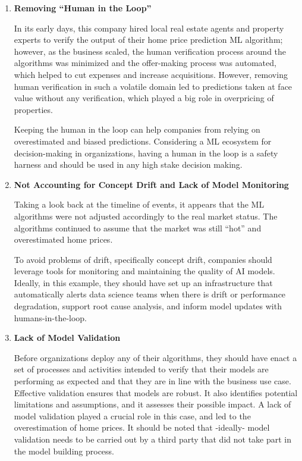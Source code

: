 \documentclass{article}
\begin{document}
\begin{enumerate}
    \item \textbf{Removing ``Human in the Loop''}
    
    \smallskip In its early days, this company hired local real estate agents and property experts to verify the output of their home price prediction ML algorithm; however, as the business scaled, the human verification process around the algorithms was minimized\cite{bloomberg} and the offer-making process was automated, which helped to cut expenses and increase acquisitions.
    However, removing human verification in such a volatile domain led to predictions taken at face value without any verification, which played a big role in overpricing of properties.
    
    \smallskip Keeping the human in the loop can help companies from relying on overestimated and biased predictions.
    Considering a ML ecosystem for decision-making in organizations, having a human in the loop is a safety harness and should be used in any high stake decision making.
    
    \item \textbf{Not Accounting for Concept Drift and Lack of Model Monitoring}
    
    \smallskip Taking a look back at the timeline of events, it appears that the ML algorithms were not adjusted accordingly to the real market status\cite{bloomberg}. The algorithms continued to assume that the market was still ``hot'' and overestimated home prices.
    
    \smallskip To avoid problems of drift, specifically concept drift, companies should leverage tools for monitoring and maintaining the quality of AI models. Ideally, in this example, they should have set up an infrastructure that automatically alerts data science teams when there is drift or performance degradation, support root cause analysis, and inform model updates with humans-in-the-loop.
    
    \item \textbf{Lack of Model Validation}
    
    \smallskip Before organizations deploy any of their algorithms, they should have enact a set of processes and activities intended to verify that their models are performing as expected and that they are in line with the business use case. Effective validation ensures that models are robust. It also identifies potential limitations and assumptions, and it assesses their possible impact. 
    A lack of model validation played a crucial role in this case, and led to the overestimation of home prices. It should be noted that -ideally- model validation needs to be carried out by a third party that did not take part in the model building process.
    

\end{enumerate}
\end{document}
